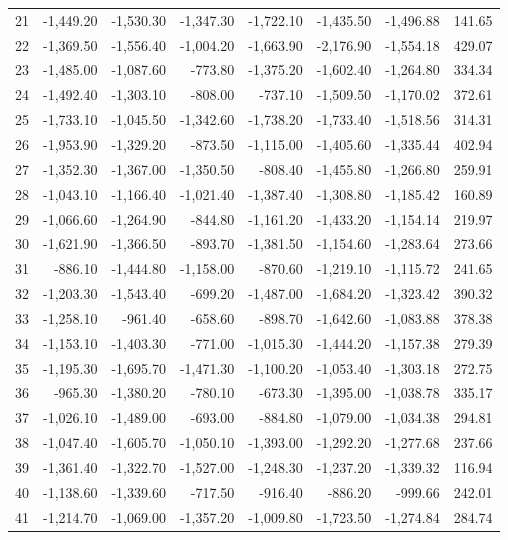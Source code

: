 \begin{longtable}{rrrrrrrr}
21 & -1,449.20 & -1,530.30 & -1,347.30 & -1,722.10 & -1,435.50 & -1,496.88 & 141.65  \\
22 & -1,369.50 & -1,556.40 & -1,004.20 & -1,663.90 & -2,176.90 & -1,554.18 & 429.07  \\
23 & -1,485.00 & -1,087.60 & -773.80 & -1,375.20 & -1,602.40 & -1,264.80 & 334.34  \\
24 & -1,492.40 & -1,303.10 & -808.00 & -737.10 & -1,509.50 & -1,170.02 & 372.61  \\
25 & -1,733.10 & -1,045.50 & -1,342.60 & -1,738.20 & -1,733.40 & -1,518.56 & 314.31  \\
26 & -1,953.90 & -1,329.20 & -873.50 & -1,115.00 & -1,405.60 & -1,335.44 & 402.94  \\
27 & -1,352.30 & -1,367.00 & -1,350.50 & -808.40 & -1,455.80 & -1,266.80 & 259.91  \\
28 & -1,043.10 & -1,166.40 & -1,021.40 & -1,387.40 & -1,308.80 & -1,185.42 & 160.89  \\
29 & -1,066.60 & -1,264.90 & -844.80 & -1,161.20 & -1,433.20 & -1,154.14 & 219.97  \\
30 & -1,621.90 & -1,366.50 & -893.70 & -1,381.50 & -1,154.60 & -1,283.64 & 273.66  \\
31 & -886.10 & -1,444.80 & -1,158.00 & -870.60 & -1,219.10 & -1,115.72 & 241.65  \\
32 & -1,203.30 & -1,543.40 & -699.20 & -1,487.00 & -1,684.20 & -1,323.42 & 390.32  \\
33 & -1,258.10 & -961.40 & -658.60 & -898.70 & -1,642.60 & -1,083.88 & 378.38  \\
34 & -1,153.10 & -1,403.30 & -771.00 & -1,015.30 & -1,444.20 & -1,157.38 & 279.39  \\
35 & -1,195.30 & -1,695.70 & -1,471.30 & -1,100.20 & -1,053.40 & -1,303.18 & 272.75  \\
36 & -965.30 & -1,380.20 & -780.10 & -673.30 & -1,395.00 & -1,038.78 & 335.17  \\
37 & -1,026.10 & -1,489.00 & -693.00 & -884.80 & -1,079.00 & -1,034.38 & 294.81  \\
38 & -1,047.40 & -1,605.70 & -1,050.10 & -1,393.00 & -1,292.20 & -1,277.68 & 237.66  \\
39 & -1,361.40 & -1,322.70 & -1,527.00 & -1,248.30 & -1,237.20 & -1,339.32 & 116.94  \\
40 & -1,138.60 & -1,339.60 & -717.50 & -916.40 & -886.20 & -999.66 & 242.01  \\
41 & -1,214.70 & -1,069.00 & -1,357.20 & -1,009.80 & -1,723.50 & -1,274.84 & 284.74  \\

\end{longtable}
